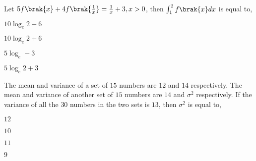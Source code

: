	\item Let $5f\brak{x}+4f\brak{\frac{1}{x}}=\frac{1}{x}+3, x>0$, then $\int_1^2f\brak{x}dx$ is equal to,
			\hfill{} \\ \begin{enumerate}
		\end{enumerate}
	\item The mean and variance of a set of $15$ numbers are $12$ and $14$ respectively. The mean and variance of another set of $15$ numbers are $14$ and $\sigma^2$ respectively. If the variance of all the $30$ numbers in the two sets is $13$, then $\sigma^2$ is equal to,
		\hfill{} \\ \begin{enumerate}
				\begin{multicols}{2}
				\item $12$
				\columnbreak
			\item $10$
				\end{multicols}
				\begin{multicols}{2}
				\item $11$
				\columnbreak
			\item $9$
				\end{multicols}
			\end{enumerate}
